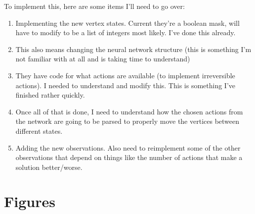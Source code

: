 \documentclass{article}
\begin{document}
To implement this, here are some items I'll need to go over:

\begin{enumerate}
    \item Implementing the new vertex states. Current they're a boolean mask, will have to modify to be a list of integers most likely. I've done this already.
    \item This also means changing the neural network structure (this is something I'm not familiar with at all and is taking time to understand)
    \item They have code for what actions are available (to implement irreversible actions). I needed to understand and modify this. This is something I've finished rather quickly.
    \item Once all of that is done, I need to understand how the chosen actions from the network are going to be parsed to properly move the vertices between different states.
    \item Adding the new observations. Also need to reimplement some of the other observations that depend on things like the number of actions that make a solution better/worse.
\end{enumerate}



\clearpage
\section{Figures}


\end{document}
